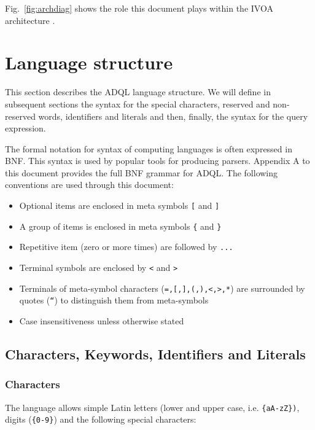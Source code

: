 \documentclass[11pt,a4paper]{ivoa}
\begin{document}
Fig.~\ref{fig:archdiag} shows the role this document plays within the
IVOA architecture \citep{note:VOARCH}.

\clearpage
\section{Language structure}
\label{sec:language}

This section describes the ADQL language structure. We will define in
subsequent sections the syntax for the special characters, reserved and non-
reserved words, identifiers and literals and then, finally, the syntax for
the query expression.

The formal notation for syntax of computing languages is often expressed
in BNF. This syntax is used by popular tools for
producing parsers. Appendix A to this document provides the full BNF grammar
for ADQL. The following conventions are used through this document:

\begin{itemize}
    \item Optional items are enclosed in meta symbols \verb:[: and \verb:]:
    \item A group of items is enclosed in meta symbols \verb:{: and \verb:}:
    \item Repetitive item (zero or more times) are followed by \verb:...:
    \item Terminal symbols are enclosed by \verb:<: and \verb:>:
    \item Terminals of meta-symbol characters (\verb:=,[,],(,),<,>,*:) are surrounded by quotes (\verb:“:) to distinguish them from meta-symbols
    \item Case insensitiveness unless otherwise stated
\end{itemize}

\clearpage
\subsection{Characters, Keywords, Identifiers and Literals}
\subsubsection{Characters}
\label{sec:characters}

The language allows simple Latin letters (lower and upper case, i.e.
\verb:{aA-zZ}):, digits (\verb:{0-9}:) and the following special characters:
\end{document}
